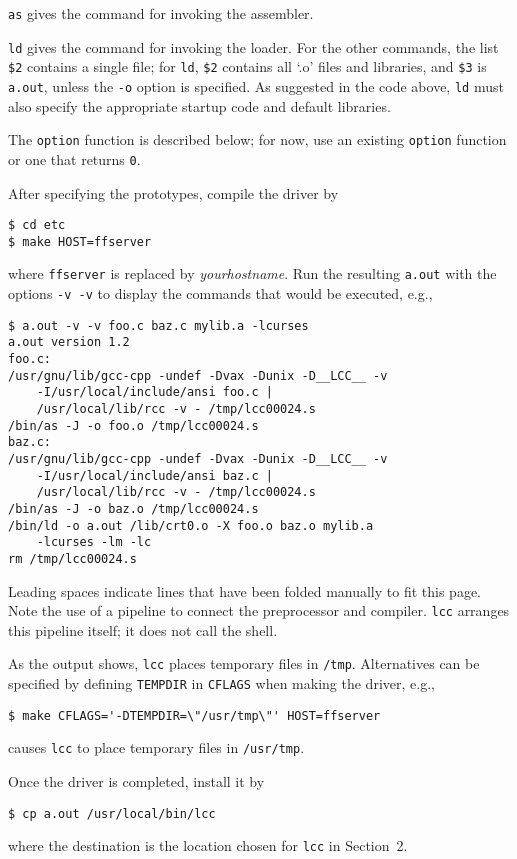 \verb|as| gives the command for invoking the assembler.

\verb|ld| gives the command for invoking the loader.
For the other commands, the list \verb|$2| contains a single file;
for \verb|ld|, \verb|$2| contains all `.o' files and libraries, and
\verb|$3| is \verb|a.out|, unless the \verb|-o| option is specified.
As suggested in the code above, \verb|ld| must also specify
the appropriate startup code and default libraries.

The \verb|option| function is described below;
for now, use an existing \verb|option| function or one that returns \verb|0|.

After specifying the prototypes, compile the driver by
\begin{verbatim}
$ cd etc
$ make HOST=ffserver
\end{verbatim}
where \verb|ffserver| is replaced by {\it yourhostname}.
Run the resulting \verb|a.out| with the options \verb|-v -v|
to display the commands that would be executed, e.g.,
\begin{verbatim}
$ a.out -v -v foo.c baz.c mylib.a -lcurses
a.out version 1.2
foo.c:
/usr/gnu/lib/gcc-cpp -undef -Dvax -Dunix -D__LCC__ -v
    -I/usr/local/include/ansi foo.c |
    /usr/local/lib/rcc -v - /tmp/lcc00024.s
/bin/as -J -o foo.o /tmp/lcc00024.s
baz.c:
/usr/gnu/lib/gcc-cpp -undef -Dvax -Dunix -D__LCC__ -v
    -I/usr/local/include/ansi baz.c |
    /usr/local/lib/rcc -v - /tmp/lcc00024.s
/bin/as -J -o baz.o /tmp/lcc00024.s
/bin/ld -o a.out /lib/crt0.o -X foo.o baz.o mylib.a
    -lcurses -lm -lc
rm /tmp/lcc00024.s
\end{verbatim}
Leading spaces indicate lines that have been folded manually to fit this page.
Note the use of a pipeline to connect the preprocessor and compiler.
\verb|lcc| arranges this pipeline itself; it does not call the shell.
 
As the output shows, \verb|lcc| places temporary files in \verb|/tmp|.
Alternatives can be specified by defining \verb|TEMPDIR| in \verb|CFLAGS|
when making the driver, e.g.,
\begin{verbatim}
$ make CFLAGS='-DTEMPDIR=\"/usr/tmp\"' HOST=ffserver
\end{verbatim}
causes \verb|lcc| to place temporary files in \verb|/usr/tmp|.

Once the driver is completed, install it by
\begin{verbatim}
$ cp a.out /usr/local/bin/lcc
\end{verbatim}
where the destination is the location chosen for \verb|lcc| in Section~2.

